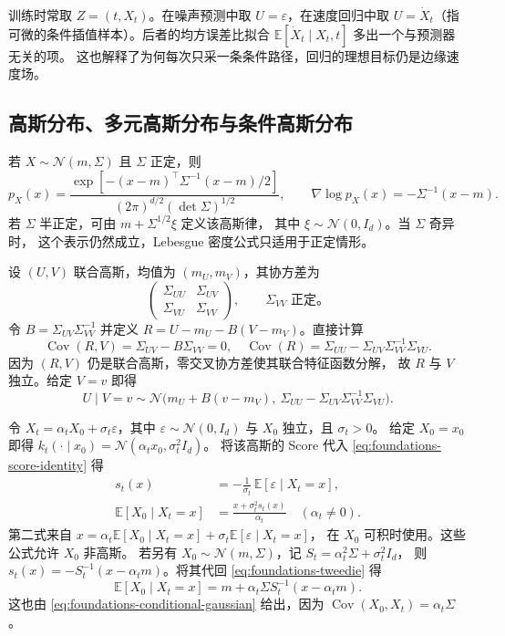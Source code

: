训练时常取 \(Z=(t,X_t)\)。在噪声预测中取 \(U=\varepsilon\)，在速度回归中取
\(U=\dot X_t\)（指可微的条件插值样本）。后者的均方误差比拟合
\(\mathbb E[\dot X_t\mid X_t,t]\) 多出一个与预测器无关的项。
这也解释了为何每次只采一条条件路径，回归的理想目标仍是边缘速度场。

\subsection{高斯分布、多元高斯分布与条件高斯分布\requiredderivation}

若 \(X\sim\mathcal N(m,\Sigma)\) 且 \(\Sigma\) 正定，则
\[
  p_X(x)=\frac{\exp[-(x-m)^\top\Sigma^{-1}(x-m)/2]}
                   {(2\pi)^{d/2}(\det\Sigma)^{1/2}},
  \qquad \nabla\log p_X(x)=-\Sigma^{-1}(x-m).
\]
若 \(\Sigma\) 半正定，可由 \(m+\Sigma^{1/2}\xi\) 定义该高斯律，
其中 \(\xi\sim\mathcal N(0,I_d)\)。当 \(\Sigma\) 奇异时，
这个表示仍然成立，Lebesgue 密度公式只适用于正定情形。

设 \((U,V)\) 联合高斯，均值为 \((m_U,m_V)\)，其协方差为
\[
  \begin{pmatrix}\Sigma_{UU}&\Sigma_{UV}\\\Sigma_{VU}&\Sigma_{VV}\end{pmatrix},
  \qquad \Sigma_{VV}\text{ 正定。}
\]
令 \(B=\Sigma_{UV}\Sigma_{VV}^{-1}\) 并定义
\(R=U-m_U-B(V-m_V)\)。直接计算
\[
  \operatorname{Cov}(R,V)=\Sigma_{UV}-B\Sigma_{VV}=0,\quad
  \operatorname{Cov}(R)=\Sigma_{UU}-\Sigma_{UV}\Sigma_{VV}^{-1}\Sigma_{VU}.
\]
因为 \((R,V)\) 仍是联合高斯，零交叉协方差使其联合特征函数分解，
故 \(R\) 与 \(V\) 独立。给定 \(V=v\) 即得
\begin{equation}
  U\mid V=v\sim\mathcal N\bigl(
     m_U+B(v-m_V),\
     \Sigma_{UU}-\Sigma_{UV}\Sigma_{VV}^{-1}\Sigma_{VU}
  \bigr).
  \label{eq:foundations-conditional-gaussian}
\end{equation}

\begin{example}[高斯加噪与去噪回归]
令 \(X_t=\alpha_tX_0+\sigma_t\varepsilon\)，其中
\(\varepsilon\sim\mathcal N(0,I_d)\) 与 \(X_0\) 独立，且 \(\sigma_t>0\)。
给定 \(X_0=x_0\) 即得 \(k_t(\cdot\mid x_0)=\mathcal N(\alpha_tx_0,\sigma_t^2I_d)\)。
将该高斯的 Score 代入 \eqref{eq:foundations-score-identity} 得
\begin{align}
  s_t(x)
    &=-\frac{1}{\sigma_t}\,\mathbb E[\varepsilon\mid X_t=x],
      \label{eq:foundations-score-noise}\\
  \mathbb E[X_0\mid X_t=x]
    &=\frac{x+\sigma_t^2s_t(x)}{\alpha_t}
      \quad(\alpha_t\ne 0).
      \label{eq:foundations-tweedie}
\end{align}
第二式来自 \(x=\alpha_t\mathbb E[X_0\mid X_t=x]+\sigma_t\mathbb E[\varepsilon\mid X_t=x]\)，
在 \(X_0\) 可积时使用。这些公式允许 \(X_0\) 非高斯。
若另有 \(X_0\sim\mathcal N(m,\Sigma)\)，记 \(S_t=\alpha_t^2\Sigma+\sigma_t^2I_d\)，
则 \(s_t(x)=-S_t^{-1}(x-\alpha_tm)\)。将其代回
\eqref{eq:foundations-tweedie} 得
\[
  \mathbb E[X_0\mid X_t=x]
   =m+\alpha_t\Sigma S_t^{-1}(x-\alpha_tm).
\]
这也由 \eqref{eq:foundations-conditional-gaussian} 给出，因为
\(\operatorname{Cov}(X_0,X_t)=\alpha_t\Sigma\)。
\end{example}

